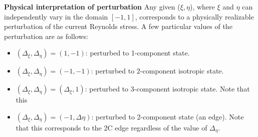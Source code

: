\documentclass[paper = letter, fontsize = 11pt]{scrartcl} %
\begin{document}
\textbf{Physical interpretation of perturbation}
Any given ($\xi, \eta$), where $\xi$ and $\eta$ can independently vary in the domain $[-1, 1]$,
corresponds to a physically realizable perturbation of the current Reynolds stress. A few particular
values of the perturbation are as follows: 

 \begin{itemize}
 \item $(\Delta_\xi, \Delta_\eta) = (1, -1)$: perturbed to 1-component state. 
 \item $(\Delta_\xi, \Delta_\eta) = (-1, -1)$: perturbed to 2-component isotropic state. 
 \item $(\Delta_\xi, \Delta_\eta) = (\Delta_\xi, 1)$: perturbed to 3-component isotropic state. Note that this
 \item $(\Delta_\xi, \Delta_\eta) = (-1, \Delta\eta)$: perturbed to 2-component  state (an edge). Note that this
   corresponds to the 2C edge regardless of the value of $\Delta_\eta$.
 \end{itemize}
\end{document}
